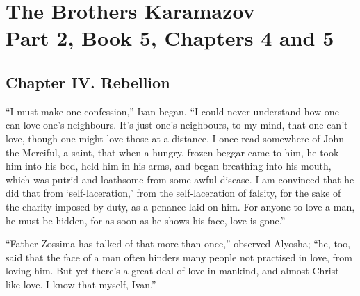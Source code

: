 
\author{Fyodor Dostoevsky}

\chapter[Fyodor Dostoevsky -- The Brothers Karamazov, excerpt]{The
Brothers Karamazov\\\smaller Part 2, Book 5, Chapters 4 and 5}


\section*{Chapter IV. Rebellion}

``I must make one confession,'' Ivan began. ``I could never understand
how one can love one's neighbours. It's just one's neighbours, to my
mind, that one can't love, though one might  love those at a
distance. I once read somewhere of John the Merciful, a saint, that
when a hungry, frozen beggar came to him, he took him into his bed,
held him in his arms, and began breathing into his mouth, which was
putrid and loathsome from some awful disease. I am convinced that he
did that from `self-laceration,' from the self-laceration of falsity,
for the sake of the charity imposed by duty, as a penance laid on him.
For anyone to love a man, he must be hidden, for as soon as he shows
his face, love is gone.''

``Father Zossima has talked of that more than once,'' observed
Alyosha; ``he, too, said that the face of a man often hinders many
people not practised in love, from loving him. But yet there's a great
deal of love in mankind, and almost Christ-like love. I know that
myself, Ivan.''

